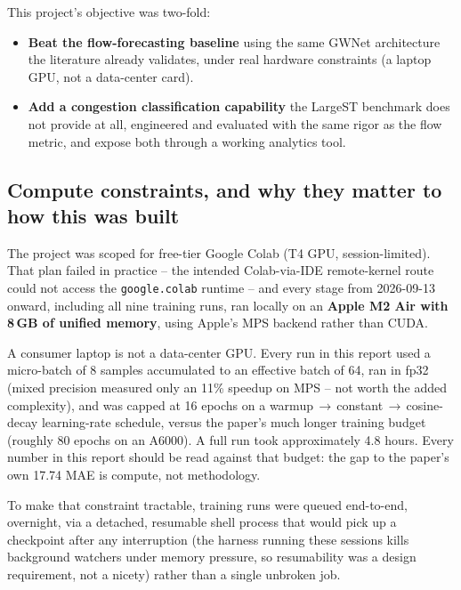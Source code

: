 \documentclass[11pt]{article}
\newcommand{\code}[1]{\texttt{\small #1}}
\begin{document}
This project's objective was two-fold:

\begin{itemize}
\item \textbf{Beat the flow-forecasting baseline} using the same GWNet architecture the
  literature already validates, under real hardware constraints (a laptop GPU, not a
  data-center card).
\item \textbf{Add a congestion classification capability} the LargeST benchmark does not
  provide at all, engineered and evaluated with the same rigor as the flow metric, and expose
  both through a working analytics tool.
\end{itemize}

\subsection{Compute constraints, and why they matter to how this was built}

The project was scoped for free-tier Google Colab (T4 GPU, session-limited). That plan failed in
practice -- the intended Colab-via-IDE remote-kernel route could not access the \code{google.colab}
runtime -- and every stage from 2026-09-13 onward, including all nine training runs, ran locally
on an \textbf{Apple M2 Air with 8\,GB of unified memory}, using Apple's MPS backend rather than
CUDA.

\begin{sowhat}
A consumer laptop is not a data-center GPU. Every run in this report used a micro-batch of 8
samples accumulated to an effective batch of 64, ran in fp32 (mixed precision measured only an
11\% speedup on MPS -- not worth the added complexity), and was capped at 16 epochs on a
warmup\,$\to$\,constant\,$\to$\,cosine-decay learning-rate schedule, versus the paper's much
longer training budget (roughly 80 epochs on an A6000). A full run took approximately 4.8 hours.
Every number in this report should be read against that budget: the gap to the paper's own
17.74 MAE is compute, not methodology.
\end{sowhat}

To make that constraint tractable, training runs were queued end-to-end, overnight, via a
detached, resumable shell process that would pick up a checkpoint after any interruption (the
harness running these sessions kills background watchers under memory pressure, so resumability
was a design requirement, not a nicety) rather than a single unbroken job.

\end{document}
